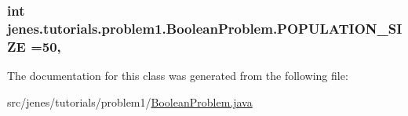 \hypertarget{classjenes_1_1tutorials_1_1problem1_1_1_boolean_problem_ae2de55d7e4eebd12eb9a904fce0ad017}{
\subsubsection[{P\-O\-P\-U\-L\-A\-T\-I\-O\-N\-\_\-\-S\-I\-Z\-E}]{\setlength{\rightskip}{0pt plus 5cm}int jenes.\-tutorials.\-problem1.\-Boolean\-Problem.\-P\-O\-P\-U\-L\-A\-T\-I\-O\-N\-\_\-\-S\-I\-Z\-E =50\hspace{0.3cm}{\ttfamily [static]}, {\ttfamily [private]}}}\label{classjenes_1_1tutorials_1_1problem1_1_1_boolean_problem_ae2de55d7e4eebd12eb9a904fce0ad017}


The documentation for this class was generated from the following file\-:\begin{DoxyCompactItemize}
\item 
src/jenes/tutorials/problem1/\hyperlink{problem1_2_boolean_problem_8java}{Boolean\-Problem.\-java}\end{DoxyCompactItemize}
